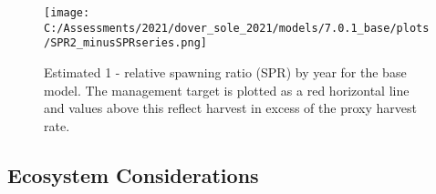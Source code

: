 \documentclass[11pt,
  english,
  a4paper,
]{article}
\begin{document}
\leavevmode\tagmcend\tagstructend\par




\begin{figure}
\centering
\texttt{[image: C:/Assessments/2021/dover\_sole\_2021/models/7.0.1\_base/plots/SPR2\_minusSPRseries.png]}
\caption{Estimated 1 - relative spawning ratio (SPR) by year for the base model. The management target is plotted as a red horizontal line and values above this reflect harvest in excess of the proxy harvest rate.\label{fig:es-1-spr}}
\end{figure}

\tagmcend\tagstructend

\clearpage


\hypertarget{ecosystem-considerations}{%
\subsection*{Ecosystem Considerations}\label{ecosystem-considerations}}

\leavevmode\tagmcend\tagstructend

\end{document}
